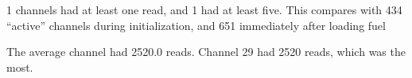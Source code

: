1 channels had at least one read, and 1 had at least five.  
This compares with 434 ``active'' channels during initialization, and 651 immediately after loading fuel

The average channel had 2520.0 reads. 
Channel 29 had 2520 reads, which was the most.
